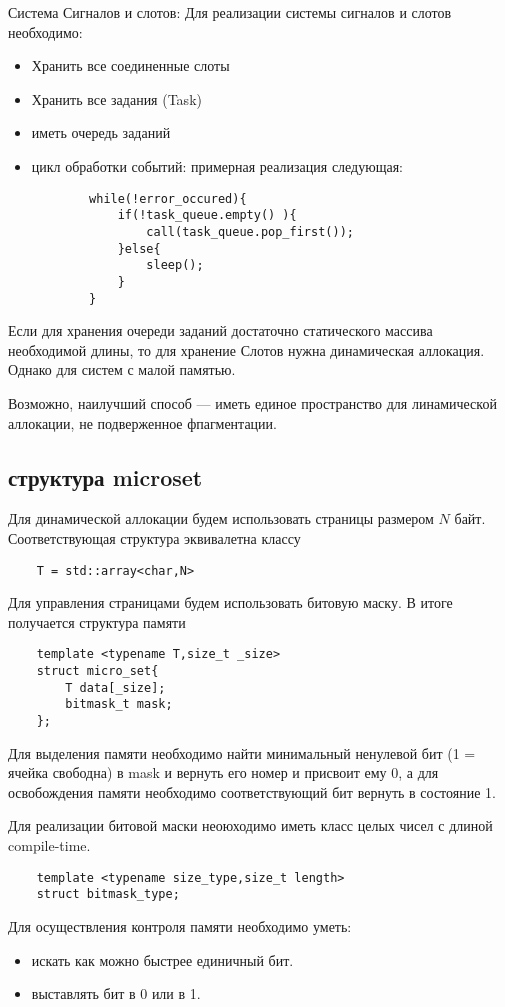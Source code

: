 Система Сигналов и слотов:
Для реализации системы сигналов и слотов необходимо:
\begin{itemize}
	\item Хранить все соединенные слоты
	\item Хранить все задания (Task)
	\item иметь очередь заданий
	\item цикл обработки событий: примерная реализация следующая:
	\begin{lstlisting}
		while(!error_occured){
			if(!task_queue.empty() ){
				call(task_queue.pop_first());
			}else{
				sleep();	
			}
		}
	\end{lstlisting}
\end{itemize}
Если для хранения очереди заданий достаточно статического массива необходимой длины, то для хранение Слотов нужна динамическая аллокация. Однако для систем с малой памятью.

Возможно, наилучший способ --- иметь единое пространство для линамической аллокации, не подверженное фпагментации.

\subsection{структура microset}
Для динамической аллокации будем использовать страницы размером $N$ байт. Соответствующая структура эквивалетна классу \begin{lstlisting}
	T = std::array<char,N>
\end{lstlisting}

Для управления страницами будем использовать битовую маску. В итоге получается структура памяти
\begin{lstlisting}
	template <typename T,size_t _size>
	struct micro_set{
		T data[_size];
		bitmask_t mask;
	};
\end{lstlisting}

Для выделения памяти необходимо найти минимальный ненулевой бит (1 = ячейка свободна) в mask и вернуть его номер и присвоит ему 0, а для освобождения памяти необходимо соответствующий бит вернуть в состояние 1.

Для реализации битовой маски неоюходимо иметь класс целых чисел с длиной compile-time.
\begin{lstlisting}
	template <typename size_type,size_t length>
	struct bitmask_type;
\end{lstlisting}

Для осуществления контроля памяти необходимо уметь:
\begin{itemize}
	\item искать как можно быстрее единичный бит.
	\item выставлять бит в 0 или в 1.
\end{itemize}


